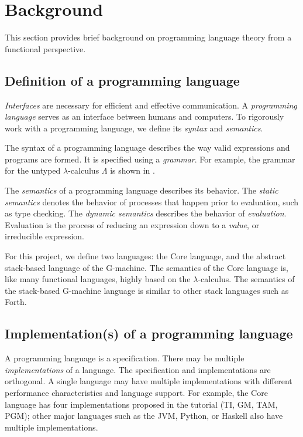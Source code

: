 \section{Background}
\label{sec:background}

This section provides brief background on programming language theory from a functional perspective.

\subsection{Definition of a programming language}
\label{sec:pl-definition}

\textit{Interfaces} are necessary for efficient and effective communication. A \textit{programming language} serves as an interface between humans and computers. To rigorously work with a programming language, we define its \textit{syntax} and \textit{semantics}.

The syntax of a programming language describes the way valid expressions and programs are formed. It is specified using a \textit{grammar}. For example, the grammar for the untyped $\lambda$-calculus $\Lambda$ is shown in .

The \textit{semantics} of a programming language describes its behavior. The \textit{static semantics} denotes the behavior of processes that happen prior to evaluation, such as type checking. The \textit{dynamic semantics} describes the behavior of \textit{evaluation}. Evaluation is the process of reducing an expression down to a \textit{value}, or irreducible expression.

For this project, we define two languages: the Core language, and the abstract stack-based language of the G-machine. The semantics of the Core language is, like many functional languages, highly based on the $\lambda$-calculus. The semantics of the stack-based G-machine language is similar to other stack languages such as Forth.

\subsection{Implementation(s) of a programming language}
\label{sec:pl-implementation}

A programming language is a specification. There may be multiple \textit{implementations} of a language. The specification and implementations are orthogonal. A single language may have multiple implementations with different performance characteristics and language support. For example, the Core language has four implementations proposed in the tutorial (TI, GM, TAM, PGM); other major languages such as the JVM, Python, or Haskell also have multiple implementations.

